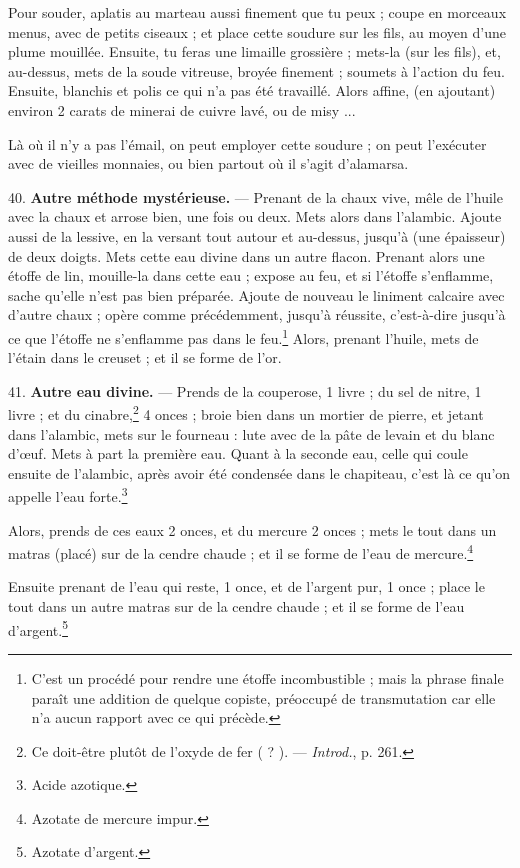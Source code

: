 \documentclass[a4paper, 11pt, oneside, polutonikogreek, french]{article}
\begin{document}
Pour souder, aplatis au marteau aussi finement que tu peux ; coupe en morceaux menus, avec de petits ciseaux ; et place cette soudure sur les fils, au moyen d'une plume mouillée. Ensuite, tu feras une limaille grossière ; mets-la (sur les fils), et, au-dessus, mets de la soude vitreuse, broyée finement ; soumets à l'action du feu. Ensuite, blanchis et polis ce qui n'a pas été travaillé. Alors affine, (en ajoutant) environ 2 carats de minerai de cuivre lavé, ou de misy ...

Là où il n'y a pas l'émail, on peut employer cette soudure ; on peut l'exécuter avec de vieilles monnaies, ou bien partout où il s'agit d'alamarsa.

40. \textbf{Autre méthode mystérieuse.} --- Prenant de la chaux vive, mêle de l'huile avec la chaux et arrose bien, une fois ou deux. Mets alors dans l'alambic. Ajoute aussi de la lessive, en la versant tout autour et au-dessus, jusqu'à (une épaisseur) de deux doigts. Mets cette eau divine dans un autre flacon. Prenant alors une étoffe de lin, mouille-la dans cette eau ; expose au feu, et si l'étoffe s'enflamme, sache qu'elle n'est pas bien préparée. Ajoute de nouveau le liniment calcaire avec d'autre chaux ; opère comme précédemment, jusqu'à réussite, c'est-à-dire jusqu'à ce que l'étoffe ne s'enflamme pas dans le feu.\footnote{C'est un procédé pour rendre une étoffe incombustible ; mais la phrase finale paraît une addition de quelque copiste, préoccupé de transmutation car elle n'a aucun rapport avec ce qui précède.} Alors, prenant l'huile, mets de l'étain dans le creuset ; et il se forme de l'or.

41. \textbf{Autre eau divine.} --- Prends de la couperose, 1 livre ; du sel de nitre, 1 livre ; et du cinabre,\footnote{Ce doit-être plutôt de l'oxyde de fer ( ? ). --- \emph{Introd.}, p. 261.} 4 onces ; broie bien dans un mortier de pierre, et jetant dans l'alambic, mets sur le fourneau : lute avec de la pâte de levain et du blanc d'œuf. Mets à part la première eau. Quant à la seconde eau, celle qui coule ensuite de l'alambic, après avoir été condensée dans le chapiteau, c'est là ce qu'on appelle l'eau forte.\footnote{Acide azotique.}

Alors, prends de ces eaux 2 onces, et du mercure 2 onces ; mets le tout dans un matras (placé) sur de la cendre chaude ; et il se forme de l'eau de mercure.\footnote{Azotate de mercure impur.}

Ensuite prenant de l'eau qui reste, 1 once, et de l'argent pur, 1 once ; place le tout dans un autre matras sur de la cendre chaude ; et il se forme de l'eau d'argent.\footnote{Azotate d'argent.}
\end{document}
